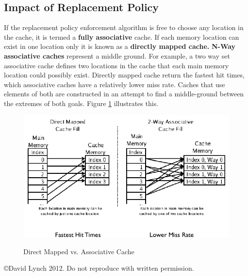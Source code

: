 \documentclass[10pt,a4paper]{article}
\begin{document}
\subsection{Impact of Replacement Policy}
If the replacement policy enforcement algorithm is free to choose any location in the cache, it is termed a \textbf{fully associative} cache. If each memory location can exist in one location only it is known as a \textbf{directly mapped cache.} \textbf{N-Way associative caches} represent a middle ground. For example, a two way set associative cache defines two locations in the cache that each main memory location could possibly exist. 
\newline\newline
Directly mapped cache return the fastest hit times, which associative caches have a relatively lower miss rate. Caches that use elements of both are constructed in an attempt to find a middle-ground between the extremes of both goals. Figure \ref{cache} illustrates this. 

\begin{figure}
\caption{Direct Mapped vs. Associative Cache}
\begin{center}
\includegraphics[scale=0.40]{../images/cache.png}
\label{cache}
\end{center}
\end{figure}



{}

\begin{center}
{\small \copyright  David Lynch 2012. Do not reproduce with written permission.}
\end{center}
\end{document}
